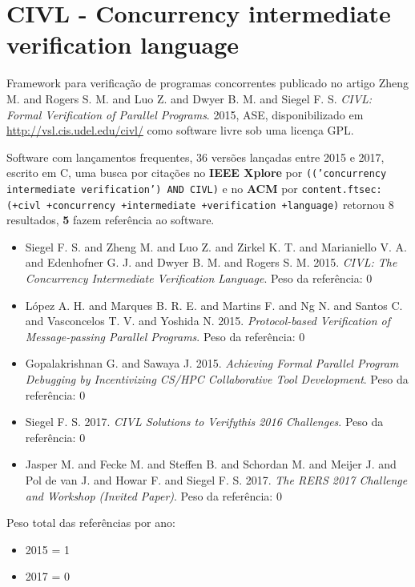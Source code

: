 \section{CIVL - Concurrency intermediate verification language}

Framework para verificação de programas concorrentes
publicado no artigo
Zheng M. and Rogers S. M. and Luo Z. and Dwyer B. M. and Siegel F. S.
{\it CIVL: Formal Verification of Parallel Programs}.
2015,
ASE,
disponibilizado em \url{http://vsl.cis.udel.edu/civl/}
como software livre
sob uma licença GPL.

Software com lançamentos frequentes,
36 versões lançadas
entre 2015 e 2017,
escrito em C,
uma busca por citações no {\bf IEEE Xplore} por
\texttt{(('concurrency intermediate verification') AND CIVL)}
e no {\bf ACM} por
\texttt{content.ftsec:(+civl +concurrency +intermediate +verification +language)}
retornou
8 resultados,
{\bf 5} fazem referência ao software.

\begin{itemize}
\item Siegel F. S. and Zheng M. and Luo Z. and Zirkel K. T. and Marianiello V. A. and Edenhofner G. J. and Dwyer B. M. and Rogers S. M.
      2015.
      {\it CIVL: The Concurrency Intermediate Verification Language}.
      Peso da referência: 0
\item L\'{o}pez A. H. and Marques B. R. E. and Martins F. and Ng N. and Santos C. and Vasconcelos T. V. and Yoshida N.
      2015.
      {\it Protocol-based Verification of Message-passing Parallel Programs}.
      Peso da referência: 0
\item Gopalakrishnan G. and Sawaya J.
      2015.
      {\it Achieving Formal Parallel Program Debugging by Incentivizing CS/HPC Collaborative Tool Development}.
      Peso da referência: 0
\item Siegel F. S.
      2017.
      {\it CIVL Solutions to Verifythis 2016 Challenges}.
      Peso da referência: 0
\item Jasper M. and Fecke M. and Steffen B. and Schordan M. and Meijer J. and Pol de van J. and Howar F. and Siegel F. S.
      2017.
      {\it The RERS 2017 Challenge and Workshop (Invited Paper)}.
      Peso da referência: 0
\end{itemize}

Peso total das referências por ano:

\begin{itemize}
\item 2015 = 1
\item 2017 = 0
\end{itemize}


